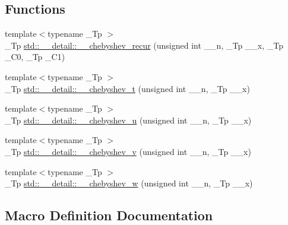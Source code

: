 \subsection*{Functions}
\begin{DoxyCompactItemize}
\item 
{\footnotesize template$<$typename \+\_\+\+Tp $>$ }\\\+\_\+\+Tp \hyperlink{namespacestd_1_1____detail_a3a893b4c60f3245af5db4ca792c4b2cf}{std\+::\+\_\+\+\_\+detail\+::\+\_\+\+\_\+chebyshev\+\_\+recur} (unsigned int \+\_\+\+\_\+n, \+\_\+\+Tp \+\_\+\+\_\+x, \+\_\+\+Tp \+\_\+\+C0, \+\_\+\+Tp \+\_\+\+C1)
\item 
{\footnotesize template$<$typename \+\_\+\+Tp $>$ }\\\+\_\+\+Tp \hyperlink{namespacestd_1_1____detail_af4ba1015e914cdd23d9e5d2be69740c1}{std\+::\+\_\+\+\_\+detail\+::\+\_\+\+\_\+chebyshev\+\_\+t} (unsigned int \+\_\+\+\_\+n, \+\_\+\+Tp \+\_\+\+\_\+x)
\item 
{\footnotesize template$<$typename \+\_\+\+Tp $>$ }\\\+\_\+\+Tp \hyperlink{namespacestd_1_1____detail_aa3289db0a53f55007bc10dc94f15c1f7}{std\+::\+\_\+\+\_\+detail\+::\+\_\+\+\_\+chebyshev\+\_\+u} (unsigned int \+\_\+\+\_\+n, \+\_\+\+Tp \+\_\+\+\_\+x)
\item 
{\footnotesize template$<$typename \+\_\+\+Tp $>$ }\\\+\_\+\+Tp \hyperlink{namespacestd_1_1____detail_a684b312a311bbe2065a2633220f4507d}{std\+::\+\_\+\+\_\+detail\+::\+\_\+\+\_\+chebyshev\+\_\+v} (unsigned int \+\_\+\+\_\+n, \+\_\+\+Tp \+\_\+\+\_\+x)
\item 
{\footnotesize template$<$typename \+\_\+\+Tp $>$ }\\\+\_\+\+Tp \hyperlink{namespacestd_1_1____detail_ae220390e755bdc4908e040fd68426d14}{std\+::\+\_\+\+\_\+detail\+::\+\_\+\+\_\+chebyshev\+\_\+w} (unsigned int \+\_\+\+\_\+n, \+\_\+\+Tp \+\_\+\+\_\+x)
\end{DoxyCompactItemize}


\subsection{Macro Definition Documentation}
\hypertarget{sf__chebyshev_8tcc_a4a6b0a9b7599b04e1e7316ab679fa7f5}{}

